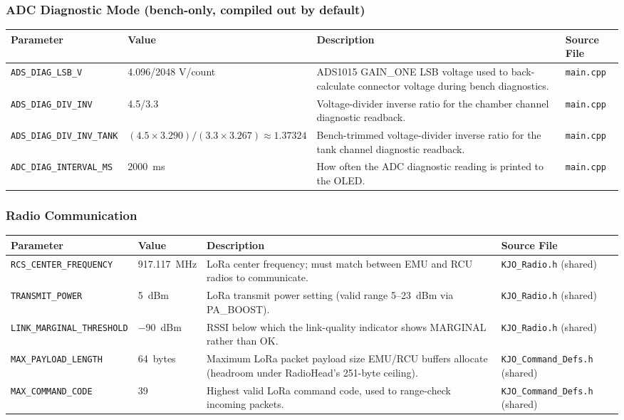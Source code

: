 ﻿\documentclass[11pt,letterpaper]{article}
\begin{document}
\subsubsection*{ADC Diagnostic Mode (bench-only, compiled out by default)}

\begingroup
\footnotesize
\begin{longtable}{@{}p{3.2cm}p{2.4cm}p{6.2cm}p{2.6cm}@{}}
\toprule
Parameter & Value & Description & Source File \\
\midrule
\texttt{ADS\_\allowbreak DIAG\_\allowbreak LSB\_\allowbreak V} & 4.096/2048 V/count & ADS1015 GAIN\_\allowbreak ONE LSB voltage used to back-calculate connector voltage during bench diagnostics. & \texttt{main.cpp} \\
\texttt{ADS\_\allowbreak DIAG\_\allowbreak DIV\_\allowbreak INV} & 4.5/3.3 & Voltage-divider inverse ratio for the chamber channel diagnostic readback. & \texttt{main.cpp} \\
\texttt{ADS\_\allowbreak DIAG\_\allowbreak DIV\_\allowbreak INV\_\allowbreak TANK} & $(4.5\times3.290)/(3.3\times3.267) \approx 1.37324$ & Bench-trimmed voltage-divider inverse ratio for the tank channel diagnostic readback. & \texttt{main.cpp} \\
\texttt{ADC\_\allowbreak DIAG\_\allowbreak INTERVAL\_\allowbreak MS} & 2000~ms & How often the ADC diagnostic reading is printed to the OLED. & \texttt{main.cpp} \\
\end{longtable}
\endgroup

\subsubsection*{Radio Communication}

\begingroup
\footnotesize
\begin{longtable}{@{}p{3.2cm}p{2.4cm}p{6.2cm}p{2.6cm}@{}}
\toprule
Parameter & Value & Description & Source File \\
\midrule
\texttt{RCS\_\allowbreak CENTER\_\allowbreak FREQUENCY} & 917.117~MHz & LoRa center frequency; must match between EMU and RCU radios to communicate. & \texttt{KJO\_\allowbreak Radio.h} (shared) \\
\texttt{TRANSMIT\_\allowbreak POWER} & 5~dBm & LoRa transmit power setting (valid range 5--23~dBm via PA\_\allowbreak BOOST). & \texttt{KJO\_\allowbreak Radio.h} (shared) \\
\texttt{LINK\_\allowbreak MARGINAL\_\allowbreak THRESHOLD} & $-$90~dBm & RSSI below which the link-quality indicator shows MARGINAL rather than OK. & \texttt{KJO\_\allowbreak Radio.h} (shared) \\
\texttt{MAX\_\allowbreak PAYLOAD\_\allowbreak LENGTH} & 64~bytes & Maximum LoRa packet payload size EMU/RCU buffers allocate (headroom under RadioHead's 251-byte ceiling). & \texttt{KJO\_\allowbreak Command\_\allowbreak Defs.h} (shared) \\
\texttt{MAX\_\allowbreak COMMAND\_\allowbreak CODE} & 39 & Highest valid LoRa command code, used to range-check incoming packets. & \texttt{KJO\_\allowbreak Command\_\allowbreak Defs.h} (shared) \\
\end{longtable}
\endgroup
\end{document}
